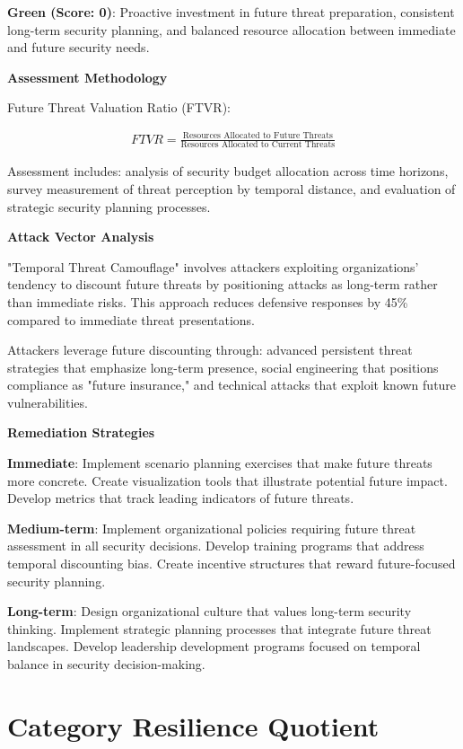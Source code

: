 \documentclass[11pt,a4paper]{article}
\begin{document}
\textbf{Green (Score: 0)}: Proactive investment in future threat preparation, consistent long-term security planning, and balanced resource allocation between immediate and future security needs.

\textbf{Assessment Methodology}

Future Threat Valuation Ratio (FTVR):

\begin{align}
FTVR = \frac{\text{Resources Allocated to Future Threats}}{\text{Resources Allocated to Current Threats}}
\end{align}

Assessment includes: analysis of security budget allocation across time horizons, survey measurement of threat perception by temporal distance, and evaluation of strategic security planning processes.

\textbf{Attack Vector Analysis}

"Temporal Threat Camouflage" involves attackers exploiting organizations' tendency to discount future threats by positioning attacks as long-term rather than immediate risks. This approach reduces defensive responses by 45\% compared to immediate threat presentations.

Attackers leverage future discounting through: advanced persistent threat strategies that emphasize long-term presence, social engineering that positions compliance as "future insurance," and technical attacks that exploit known future vulnerabilities.

\textbf{Remediation Strategies}

\textbf{Immediate}: Implement scenario planning exercises that make future threats more concrete. Create visualization tools that illustrate potential future impact. Develop metrics that track leading indicators of future threats.

\textbf{Medium-term}: Implement organizational policies requiring future threat assessment in all security decisions. Develop training programs that address temporal discounting bias. Create incentive structures that reward future-focused security planning.

\textbf{Long-term}: Design organizational culture that values long-term security thinking. Implement strategic planning processes that integrate future threat landscapes. Develop leadership development programs focused on temporal balance in security decision-making.

\section{Category Resilience Quotient}
\end{document}
